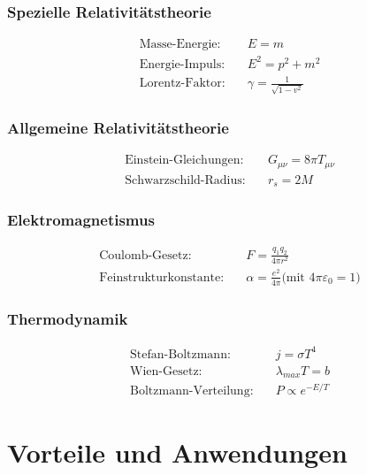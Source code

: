 	\subsubsection{Spezielle Relativitätstheorie}
	\begin{align}
		\text{Masse-Energie:} \quad & E = m \\
		\text{Energie-Impuls:} \quad & E^2 = p^2 + m^2 \\
		\text{Lorentz-Faktor:} \quad & \gamma = \frac{1}{\sqrt{1-v^2}}
	\end{align}
	
	\subsubsection{Allgemeine Relativitätstheorie}
	\begin{align}
		\text{Einstein-Gleichungen:} \quad & G_{\mu\nu} = 8\pi T_{\mu\nu} \\
		\text{Schwarzschild-Radius:} \quad & r_s = 2M
	\end{align}
	
	\subsubsection{Elektromagnetismus}
	\begin{align}
		\text{Coulomb-Gesetz:} \quad & F = \frac{q_1 q_2}{4\pi r^2} \\
		\text{Feinstrukturkonstante:} \quad & \alpha = \frac{e^2}{4\pi}
		\text{(mit } 4\pi\varepsilon_0 = 1\text{)}
	\end{align}
	
	\subsubsection{Thermodynamik}
	\begin{align}
		\text{Stefan-Boltzmann:} \quad & j = \sigma T^4 \\
		\text{Wien-Gesetz:} \quad & \lambda_{max} T = b \\
		\text{Boltzmann-Verteilung:} \quad & P \propto e^{-E/T}
	\end{align}
	
	\section{Vorteile und Anwendungen}
	
